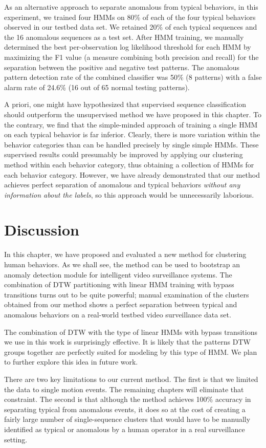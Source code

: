 As an alternative approach to separate anomalous from typical behaviors, in
this experiment, we trained four HMMs on 80\% of each of the four typical
behaviors observed in our testbed data set.  We retained 20\% of each typical
sequences and the 16 anomalous sequences as a test set. After HMM training, we
manually determined the best per-observation log likelihood threshold for each
HMM by maximizing the F1 value (a measure combining both precision and recall)
for the separation between the positive and negative test patterns.  The
anomalous pattern detection rate of the combined classifier was 50\% (8
patterns) with a false alarm rate of 24.6\% (16 out of 65 normal testing
patterns).

A priori, one might have hypothesized that supervised sequence classification
should outperform the unsupervised method we have proposed in this chapter.  To
the contrary, we find that the simple-minded approach of training a single HMM
on each typical behavior is far inferior.  Clearly, there is more variation
within the behavior categories than can be handled precisely by single simple
HMMs.  These supervised results could presumably be improved by applying our
clustering method within each behavior category, thus obtaining a collection of
HMMs for each behavior category.  However, we have already demonstrated that
our method achieves perfect separation of anomalous and typical behaviors
\textit{without any information about the labels}, so this approach would be
unnecessarily laborious.

\section{Discussion}
\label{sec:clustering-discussion}

In this chapter, we have proposed and evaluated a new method for clustering
human behaviors.  As we shall see, the method can be used to bootstrap an
anomaly detection module for intelligent video surveillance systems.  The
combination of DTW partitioning with linear HMM training with bypass
transitions turns out to be quite powerful; manual examination of the clusters
obtained from our method shows a perfect separation between typical and
anomalous behaviors on a real-world testbed video surveillance data set.

The combination of DTW with the type of linear HMMs with bypass transitions we
use in this work is surprisingly effective. It is likely that the patterns DTW
groups together are perfectly suited for modeling by this type of HMM.  We plan
to further explore this idea in future work.

There are two key limitations to our current method. The first is that we
limited the data to single motion events. The remaining chapters will eliminate
that constraint. The second is that although the method achieves 100\% accuracy
in separating typical from anomalous events, it does so at the cost of creating
a fairly large number of single-sequence clusters that would have to be
manually identified as typical or anomalous by a human operator in a real
surveillance setting.

\FloatBarrier


